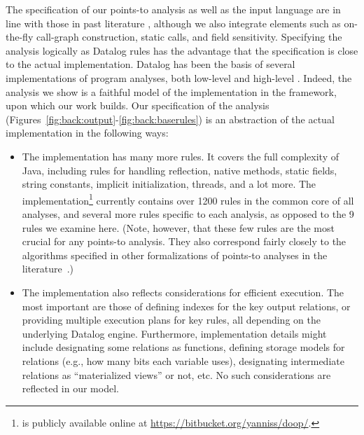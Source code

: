 The specification of our points-to analysis as well as the input language are in line with those in past literature \cite{uss:2009:Guarnieri,fse:2013:Madsen}, although we also integrate elements such as on-the-fly call-graph construction, static calls, and field sensitivity. Specifying the analysis logically as Datalog rules has the advantage that the specification is close to the actual implementation. Datalog has been the basis of several implementations of program analyses, both low-level \cite{col:1994:Reps,aplas:2005:Whaley,pods:2005:Lam,pldi:2004:Whaley,oopsla:2009:Bravenboer} and high-level \cite{icse:2008:Eichberg,ecoop:2006:Hajiyev}. Indeed, the analysis we show is a faithful model of the implementation in the \doop{} framework, upon which our work builds. Our specification of the analysis (Figures~\ref{fig:back:output}-\ref{fig:back:baserules}) is an abstraction of the actual implementation in the following ways:

\begin{itemize}
\item The implementation has many more rules. It covers the full complexity of Java, including rules for handling reflection, native methods, static fields, string constants, implicit initialization, threads, and a lot more. The \doop{} implementation\footnote{\doop{} is publicly available online at \url{https://bitbucket.org/yanniss/doop/}.} currently contains over 1200 rules in the common core of all analyses, and several more rules specific to each analysis, as opposed to the 9 rules we examine here. (Note, however, that these few rules are the most crucial for any points-to analysis. They also correspond fairly closely to the algorithms specified in other formalizations of points-to analyses in the literature~\cite{pldi:2010:Might,popl:2011:Smaragdakis}.)

\item The implementation also reflects considerations for efficient execution. The most important are those of defining indexes for the key output relations, or providing multiple execution plans for key rules, all depending on the underlying Datalog engine. Furthermore, implementation details might include designating some relations as functions, defining storage models for relations (e.g., how many bits each variable uses), designating intermediate relations as ``materialized views'' or not, etc. No such considerations are reflected in our model.
\end{itemize}

